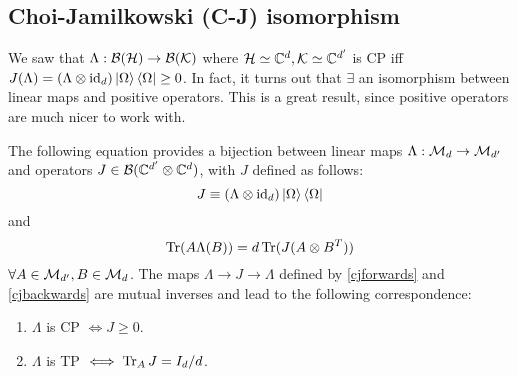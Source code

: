 \subsection*{Choi-Jamilkowski (C-J) isomorphism} We saw that $\Lambda:\mathcal{B}(\mathcal H)\to \mathcal{B}(\mathcal{K})$ where $\mathcal H\simeq \mathbb{C}^d, \mathcal{K}\simeq \mathbb{C}^{d'}$ is CP iff $J(\Lambda)=(\Lambda \otimes \operatorname{id}_d)\left| \Omega \right>\left< \Omega \right| \geq 0$. In fact, it turns out that $\exists$ an isomorphism between linear maps and positive operators. This is a great result, since positive operators are much nicer to work with.
\begin{thm}
    The following equation provides a bijection between linear maps $\Lambda:\mathcal{M}_d \to \mathcal{M}_{d'}$ and operators $J \in \mathcal{B}(\mathbb{C}^{d'}\otimes \mathbb{C}^d)$, with $J$ defined as follows:
    \begin{equation}\label{cjforwards}
        J\equiv (\Lambda \otimes \operatorname{id}_d)\left| \Omega \right>\left< \Omega \right|
    \end{equation}
    and
    \begin{equation}\label{cjbackwards}
        \operatorname{Tr}(A\Lambda(B))=d \operatorname{Tr} (J(A\otimes B^T))
    \end{equation}
    $\forall A \in \mathcal{M}_{d'},B\in \mathcal{M}_d$.
    The maps $\Lambda \to J \to \Lambda$ defined by \ref{cjforwards} and \ref{cjbackwards} are mutual inverses and lead to the following correspondence:
    \begin{enumerate}
        \item $\Lambda$ is CP $\iff J \geq 0$.
        \item $\Lambda$ is TP $\iff \operatorname{Tr}_A J = I_d/d$.
    \end{enumerate}
\end{thm}
